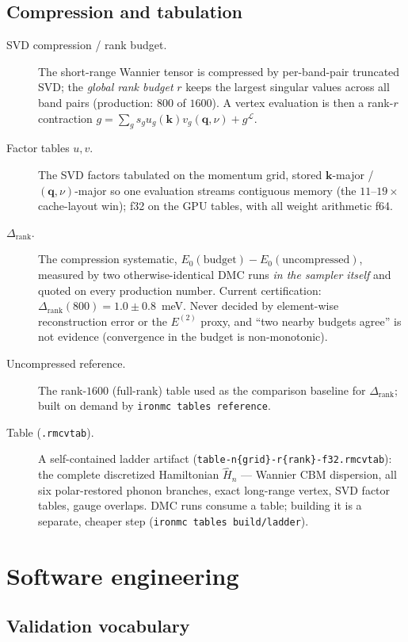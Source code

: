 \documentclass[11pt]{article}
\newcommand{\kv}{\mathbf{k}}
\newcommand{\qv}{\mathbf{q}}
\newcommand{\term}[1]{\item[#1.]}
\begin{document}
\subsection{Compression and tabulation}

\begin{description}
\term{SVD compression / rank budget} The short-range Wannier tensor is compressed by
  per-band-pair truncated SVD; the \emph{global rank budget} $r$ keeps the largest
  singular values across all band pairs (production: $800$ of $1600$). A vertex
  evaluation is then a rank-$r$ contraction
  $g=\sum_{g}s_{g}u_{g}(\kv)v_{g}(\qv,\nu)+g^{\mathcal L}$.

\term{Factor tables $u,v$} The SVD factors tabulated on the momentum grid,
  stored $\kv$-major / $(\qv,\nu)$-major so one evaluation streams contiguous memory
  (the $11$--$19\times$ cache-layout win); f32 on the GPU tables, with all weight
  arithmetic f64.

\term{$\Delta_{\mathrm{rank}}$} The compression systematic,
  $E_{0}(\text{budget})-E_{0}(\text{uncompressed})$, measured by two
  otherwise-identical DMC runs \emph{in the sampler itself} and quoted on every
  production number. Current certification: $\Delta_{\mathrm{rank}}(800)=1.0\pm0.8$~meV.
  Never decided by element-wise reconstruction error or the $E^{(2)}$ proxy, and
  ``two nearby budgets agree'' is not evidence (convergence in the budget is
  non-monotonic).

\term{Uncompressed reference} The rank-$1600$ (full-rank) table used as the
  comparison baseline for $\Delta_{\mathrm{rank}}$; built on demand by
  \texttt{ironmc tables reference}.

\term{Table (\texttt{.rmcvtab})} A self-contained ladder artifact
  (\texttt{table-n\{grid\}-r\{rank\}-f32.rmcvtab}): the complete discretized
  Hamiltonian $\hat H_{n}$ --- Wannier CBM dispersion, all six polar-restored phonon
  branches, exact long-range vertex, SVD factor tables, gauge overlaps. DMC runs
  consume a table; building it is a separate, cheaper step
  (\texttt{ironmc tables build/ladder}).
\end{description}

\section{Software engineering}
\label{sec:swe}

\subsection{Validation vocabulary}
\label{sec:swe-validation}
\end{document}
